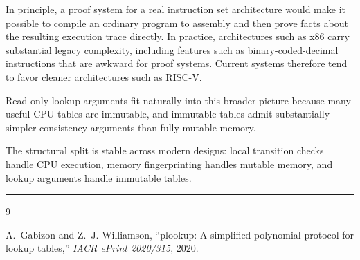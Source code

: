 \documentclass[11pt]{article}
\begin{document}
In principle, a proof system for a real instruction set architecture would make
it possible to compile an ordinary program to assembly and then prove facts
about the resulting execution trace directly.  In practice, architectures such
as x86 carry substantial legacy complexity, including features such as
binary-coded-decimal instructions that are awkward for proof systems.  Current
systems therefore tend to favor cleaner architectures such as RISC-V.

Read-only lookup arguments fit naturally into this broader picture because many
useful CPU tables are immutable, and immutable tables admit substantially
simpler consistency arguments than fully mutable memory.

\begin{remark}
The structural split is stable across modern designs: local transition checks
handle CPU execution, memory fingerprinting handles mutable memory, and lookup
arguments handle immutable tables.
\end{remark}

\bigskip
\hrule
\bigskip

\begin{thebibliography}{9}

  A.~Gabizon and Z.~J. Williamson,
  ``plookup: A simplified polynomial protocol for lookup tables,''
  \emph{IACR ePrint 2020/315}, 2020.

\end{thebibliography}
\end{document}
